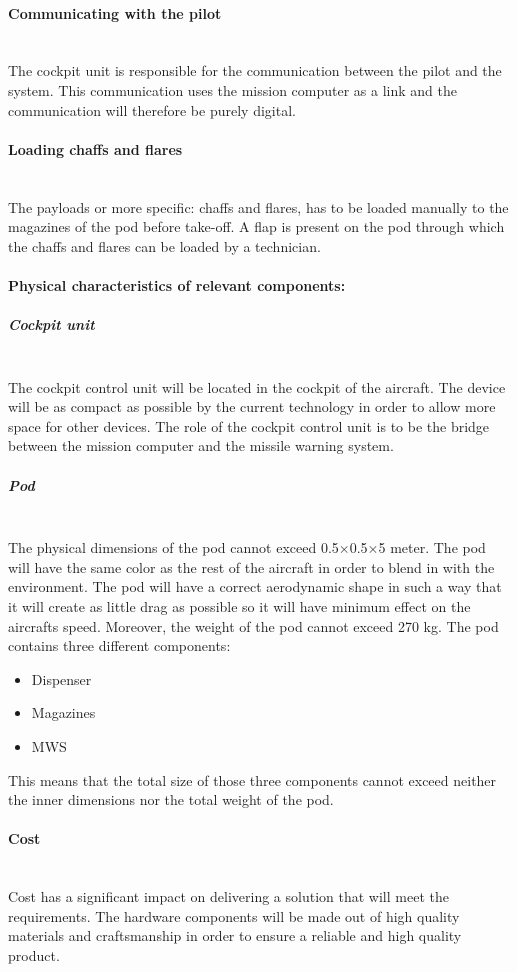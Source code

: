 \paragraph{Communicating with the pilot}  \makebox{} \\
The cockpit unit is responsible for the communication between the pilot and the system. This communication uses the mission computer as a link and the communication will therefore be purely digital.

\paragraph{Loading chaffs and flares}  \makebox{} \\
The payloads or more specific: chaffs and flares, has to be loaded manually to the magazines of the pod before take-off. A flap is present on the pod through which the chaffs and flares can be loaded by a technician.

\paragraph{Physical characteristics of relevant components:} 

\subparagraph{Cockpit unit}  \makebox{} \\
The cockpit control unit will be located in the cockpit of the aircraft. The device will be as compact as possible by the current technology in order to allow more space for other devices. The role of the cockpit control unit is to be the bridge between the mission computer and the missile warning system.

\subparagraph{Pod}  \makebox{} \\
The physical dimensions of the pod cannot exceed 0.5$\times$0.5$\times$5 meter. The pod will have the same color as the rest of the aircraft in order to blend in with the environment. The pod will have a correct aerodynamic shape in such a way that it will create as little drag as possible so it will have minimum effect on the aircrafts speed.  Moreover, the weight of the pod cannot exceed 270 kg.
The pod contains three different components:
\begin{itemize}
\item Dispenser
\item Magazines
\item MWS
\end{itemize}

This means that the total size of those three components cannot exceed neither the inner dimensions nor the total weight of the pod. 

\paragraph{Cost} \makebox{} \\
Cost has a significant impact on delivering a solution that will meet the requirements. The hardware components will be made out of high quality materials and craftsmanship in order to ensure a reliable and high quality product.

